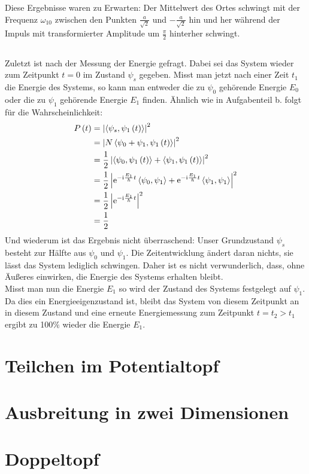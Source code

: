 \documentclass[11pt, ngerman, fleqn, DIV=15, headinclude]{scrartcl}
\begin{document}
Diese Ergebnisse waren zu Erwarten: Der Mittelwert des Ortes schwingt mit der Frequenz $\omega_{10}$ zwischen den Punkten $\frac{a}{\sqrt{2}}$ und $-\frac{a}{\sqrt{2}}$ hin und her während der Impuls mit transformierter Amplitude um $\frac{\pi}{2}$ hinterher schwingt.

\subsection{}

Zuletzt ist nach der Messung der Energie gefragt. Dabei sei das System wieder zum Zeitpunkt $t=0$ im Zustand $\psi_s$ gegeben. Misst man jetzt nach einer Zeit $t_1$ die Energie des Systems, so kann man entweder die zu $\psi_0$ gehörende Energie $E_0$ oder die zu $\psi_1$ gehörende Energie $E_1$ finden. Ähnlich wie in Aufgabenteil b. folgt für die Wahrscheinlichkeit:
\begin{align*}
	P\left( t \right)	&= \left| \left<\psi_s,\psi_1\left( t \right)\right> \right|^2\\
				&= \left| N\left<\psi_0 + \psi_1,\psi_1\left( t \right)\right> \right|^2\\
				&= \frac 12\left| \left<\psi_0,\psi_1\left( t \right)\right> + \left<\psi_1,\psi_1\left( t \right)\right> \right|^2\\
				&= \frac 12\left| \mathrm e^{-\mathrm i\frac{E_1}{\hbar}t}\left<\psi_0,\psi_1\right> + \mathrm e^{-\mathrm i\frac{E_1}{\hbar}t}\left<\psi_1,\psi_1\right> \right|^2\\
				&= \frac 12\left| \mathrm e^{-\mathrm i\frac{E_1}{\hbar}t} \right|^2\\
				&= \frac 12
\end{align*} 
Und wiederum ist das Ergebnis nicht überraschend: Unser Grundzustand $\psi_s$ besteht zur Hälfte aus $\psi_0$ und $\psi_1$. Die Zeitentwicklung ändert daran nichts, sie lässt das System lediglich schwingen. Daher ist es nicht verwunderlich, dass, ohne Äußeres einwirken, die Energie des Systems erhalten bleibt.\\
Misst man nun die Energie $E_1$ so wird der Zustand des Systems festgelegt auf $\psi_1$. Da dies ein Energieeigenzustand ist, bleibt das System von diesem Zeitpunkt an in diesem Zustand und eine erneute Energiemessung zum Zeitpunkt $t=t_2>t_1$ ergibt zu 100$\%$ wieder die Energie $E_1$.













\section{Teilchen im Potentialtopf}

\section{Ausbreitung in zwei Dimensionen}

\section{Doppeltopf}
\end{document}
